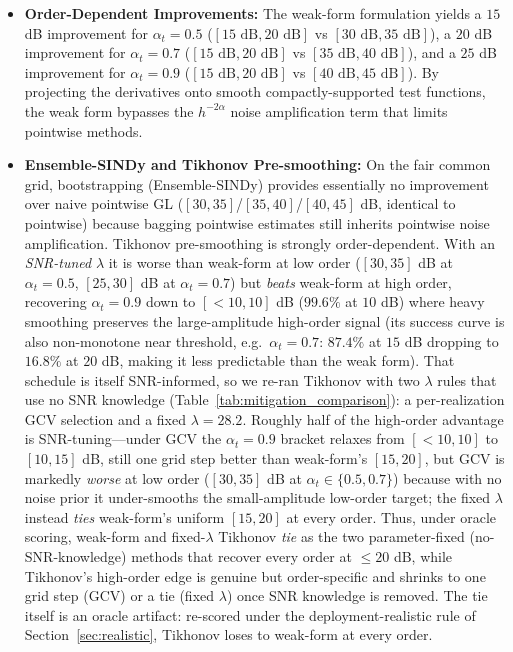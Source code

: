 \documentclass[review,3p,times]{elsarticle}
\begin{document}
\begin{itemize}
  \item \textbf{Order-Dependent Improvements:} The weak-form formulation yields a $15$ dB improvement for $\alpha_t=0.5$ ($[15\text{ dB}, 20\text{ dB}]$ vs $[30\text{ dB}, 35\text{ dB}]$), a $20$ dB improvement for $\alpha_t=0.7$ ($[15\text{ dB}, 20\text{ dB}]$ vs $[35\text{ dB}, 40\text{ dB}]$), and a $25$ dB improvement for $\alpha_t=0.9$ ($[15\text{ dB}, 20\text{ dB}]$ vs $[40\text{ dB}, 45\text{ dB}]$). By projecting the derivatives onto smooth compactly-supported test functions, the weak form bypasses the $h^{-2\alpha}$ noise amplification term that limits pointwise methods.
  \item \textbf{Ensemble-SINDy and Tikhonov Pre-smoothing:} On the fair common grid, bootstrapping (Ensemble-SINDy) provides essentially no improvement over naive pointwise GL ($[30,35]$/$[35,40]$/$[40,45]$ dB, identical to pointwise) because bagging pointwise estimates still inherits pointwise noise amplification. Tikhonov pre-smoothing is strongly order-dependent. With an \emph{SNR-tuned} $\lambda$ it is worse than weak-form at low order ($[30,35]$ dB at $\alpha_t=0.5$, $[25,30]$ dB at $\alpha_t=0.7$) but \emph{beats} weak-form at high order, recovering $\alpha_t=0.9$ down to $[{<}10,10]$ dB ($99.6\%$ at $10$ dB) where heavy smoothing preserves the large-amplitude high-order signal (its success curve is also non-monotone near threshold, e.g.\ $\alpha_t=0.7$: $87.4\%$ at $15$ dB dropping to $16.8\%$ at $20$ dB, making it less predictable than the weak form). That schedule is itself SNR-informed, so we re-ran Tikhonov with two $\lambda$ rules that use no SNR knowledge (Table~\ref{tab:mitigation_comparison}): a per-realization GCV selection and a fixed $\lambda=28.2$. Roughly half of the high-order advantage is SNR-tuning---under GCV the $\alpha_t=0.9$ bracket relaxes from $[{<}10,10]$ to $[10,15]$ dB, still one grid step better than weak-form's $[15,20]$, but GCV is markedly \emph{worse} at low order ($[30,35]$ dB at $\alpha_t\in\{0.5,0.7\}$) because with no noise prior it under-smooths the small-amplitude low-order target; the fixed $\lambda$ instead \emph{ties} weak-form's uniform $[15,20]$ at every order. Thus, under oracle scoring, weak-form and fixed-$\lambda$ Tikhonov \emph{tie} as the two parameter-fixed (no-SNR-knowledge) methods that recover every order at $\le 20$ dB, while Tikhonov's high-order edge is genuine but order-specific and shrinks to one grid step (GCV) or a tie (fixed $\lambda$) once SNR knowledge is removed. The tie itself is an oracle artifact: re-scored under the deployment-realistic rule of Section~\ref{sec:realistic}, Tikhonov loses to weak-form at every order.
\end{itemize}
\end{document}
